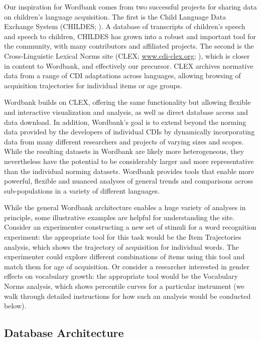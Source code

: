 \documentclass[man,noapacite]{apa}
\begin{document}
Our inspiration for Wordbank comes from two successful projects for sharing data on children's language acquisition. The first is the Child Language Data Exchange System (CHILDES; ). A database of transcripts of children's speech and speech to children, CHILDES has grown into a robust and important tool for the community, with many contributors and affiliated projects. The second is the Cross-Linguistic Lexical Norms site (CLEX; \url{www.cdi-clex.org}; ), which is closer in content to Wordbank, and effectively our precursor. CLEX archives normative data from a range of CDI adaptations across languages, allowing browsing of acquisition trajectories for individual items or age groups. 

Wordbank builds on CLEX, offering the same functionality but allowing flexible and interactive visualization and analysis, as well as direct database access and data download. In addition, Wordbank's goal is to extend beyond the norming data provided by the developers of individual CDIs by dynamically incorporating data from many different researchers and projects of varying sizes and scopes.  While the resulting datasets in Wordbank are likely more heterogeneous, they nevertheless have the potential to be considerably larger and more representative than the individual norming datasets.  Wordbank provides tools that enable more powerful, flexible and nuanced analyses of general trends and comparisons across sub-populations in a variety of different languages.

While the general Wordbank architecture enables a huge variety of analyses in principle, some illustrative examples are helpful for understanding the site. Consider an experimenter constructing a new set of stimuli for a word recognition experiment: the appropriate tool for this task would be the Item Trajectories analysis, which shows the trajectory of acquisition for individual words. The experimenter could explore different combinations of items using this tool and match them for age of acquisition. Or consider a researcher interested in gender effects on vocabulary growth: the appropriate tool would be the Vocabulary Norms analysis, which shows percentile curves for a particular instrument (we walk through detailed instructions for how such an analysis would be conducted below).

\subsection{Database Architecture}
\end{document}
